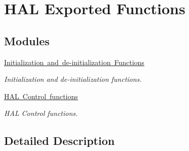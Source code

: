 \hypertarget{group___h_a_l___exported___functions}{}\section{H\+AL Exported Functions}
\label{group___h_a_l___exported___functions}
\subsection*{Modules}
\begin{DoxyCompactItemize}
\item 
\mbox{\hyperlink{group___h_a_l___exported___functions___group1}{Initialization and de-\/initialization Functions}}
\begin{DoxyCompactList}\small\item\em Initialization and de-\/initialization functions. \end{DoxyCompactList}\item 
\mbox{\hyperlink{group___h_a_l___exported___functions___group2}{H\+A\+L Control functions}}
\begin{DoxyCompactList}\small\item\em H\+AL Control functions. \end{DoxyCompactList}\end{DoxyCompactItemize}


\subsection{Detailed Description}
